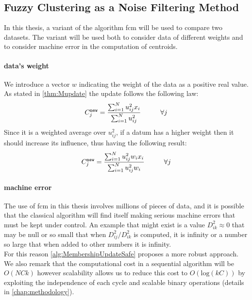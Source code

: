 \begin{toReview}
\subsection{Fuzzy Clustering as a Noise Filtering Method}
In this thesis, a variant of the algorithm \gls{fcm} will be used to compare two datasets. The variant will be used both to consider data of different weights and to consider machine error in the computation of centroids.
\paragraph{data's weight}
We introduce a vector $w$ indicating the weight of the data as a positive real value. As stated in \cref{thm:Mupdate} the update follows the following law:
\[
C^{\texttt{new}}_j = \frac{\sum_{i=1}^Nu_{ij}^2x_{i}}{\sum_{i=1}^Nu_{ij}^2} \text{\hspace{1cm}} \forall j
\]
Since it is a weighted average over $u_{ij}^2$, if a datum has a higher weight then it should increase its influence, thus having the following result:
\[
C^{\texttt{new}}_j = \frac{\sum_{i=1}^Nu_{ij}^2w_{i}x_{i}}{\sum_{i=1}^Nu_{ij}^2w_{i}} \text{\hspace{1cm}} \forall j
\]

\paragraph{machine error}
The use of \gls{fcm} in this thesis involves millions of pieces of data, and it is possible that the classical algorithm will find itself making serious machine errors that must be kept under control. An example that might exist is a value $D_{ik}^2 \approx 0$ that may be null or so small that when $D_{ij}^2 / D_{ik}^2$ is computed, it is infinity or a number so large that when added to other numbers it is infinity.\\ For this reason \cref{alg:MembershipUpdateSafe} proposes a more robust approach. We also remark that the computational cost in a sequential algorithm will be $O(NCk)$  however scalability allows us to reduce this cost to $O(\text{log}(kC))$ by exploiting the independence of each cycle and scalable binary operations (details in \cref{chap:methodology}).\\


\end{toReview}
